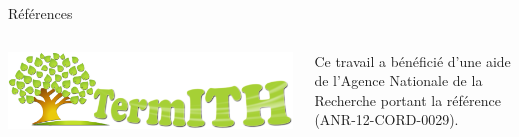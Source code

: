 \documentclass[final, xcolor={usenames, dvipsnames}]{beamer}
\begin{document}
\begin{frame}[b]{}
    \bigskip

    \begin{columns}
      \begin{column}{.95\linewidth}
        \begin{block}{Références}
          
          
        \end{block}
      \end{column}
    \end{columns}

    \begin{columns}
      \begin{column}{.2\linewidth}
        \includegraphics[width=\linewidth]{include/termith.eps}
        \vspace{1em}
      \end{column}

      \begin{column}{.75\linewidth}
        Ce travail a bénéficié d'une aide de l'Agence Nationale de la Recherche
        portant la référence (ANR-12-CORD-0029).
      \end{column}
    \end{columns}
    \vspace{.5cm}
  \end{frame}
\end{document}
